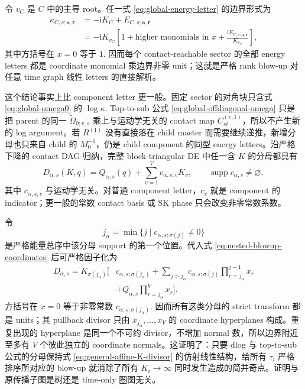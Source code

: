 \documentclass[11pt,a4paper]{ctexart}
\newcommand{\ii}{\mathrm i}
\begin{document}
令 $v_C$ 是 $C$ 中的主导 root。任一式 \eqref{eq:global-energy-letter} 的边界形式为
\begin{equation}
 \begin{split}
 \kappa_{C,s;\bm a,\bm r}
 &=-\ii K_C+E_{C,s;\bm a,\bm r}\\
 &=-\ii K_{v_C}
 \left[1+\text{higher monomials in }x
 +\frac{\ii E_{C,s;\bm a,\bm r}}{K_{v_C}}\right],
 \end{split}
 \label{eq:boundary-letter-unit}
\end{equation}
其中方括号在 $x=0$ 等于 $1$. 因而每个 contact-reachable sector 的全部 energy letters 都是 coordinate monomial 乘边界非零 unit；这就是严格 rank blow-up 对任意 time graph 线性 letters 的直接解析。

这个结论事实上比 component letter 更一般。固定 sector 的对角块只含式 \eqref{eq:global-omega0} 的 $\log\kappa$. Top-to-sub 公式 \eqref{eq:global-offdiagonal-omega} 只是把 parent 的同一 $\widetilde\Omega_{0;v,s}$ 乘上与运动学无关的 contact map $C_{st}^{(v,1)}$，所以不产生新的 log argument。若 $R^{(1)}$ 没有直接落在 child master 而需要继续递推，新增分母也只来自 child 的 $M_0^{-1}$，仍是 child component 的同型 energy letters。沿严格下降的 contact DAG 归纳，完整 block-triangular DE 中任一含 $K$ 的分母都具有
\begin{equation}
 D_{\alpha,s}(K,q)
 =Q_{\alpha,s}(q)
 +\sum_{v=1}^{V}c_{\alpha,s;v}K_v,
 \qquad
 \operatorname{supp}c_{\alpha,s}\neq\varnothing,
 \label{eq:general-affine-K-divisor}
\end{equation}
其中 $c_{\alpha,s;v}$ 与运动学无关。对普通 component letter，$c_v$ 就是 component 的 indicator；更一般的常数 contact basis 或 SK phase 只会改变非零常数系数。

令
\begin{equation}
 j_\alpha=\min\{j\mid c_{\alpha,s;\sigma(j)}\neq0\}
\end{equation}
是严格能量总序中该分母 support 的第一个位置。代入式 \eqref{eq:nested-blowup-coordinates} 后可严格因子化为
\begin{equation}
 \begin{split}
 D_{\alpha,s}
 =K_{\sigma(j_\alpha)}\Bigg[&c_{\alpha,s;\sigma(j_\alpha)}
 +\sum_{j>j_\alpha}c_{\alpha,s;\sigma(j)}
   \prod_{r=j_\alpha}^{j-1}x_r\\
 &+Q_{\alpha,s}\prod_{r=j_\alpha}^{V}x_r\Bigg].
 \end{split}
 \label{eq:affine-divisor-blowup-factorization}
\end{equation}
方括号在 $x=0$ 等于非零常数 $c_{\alpha,s;\sigma(j_\alpha)}$. 因而所有这类分母的 strict transform 都是 units；其 pullback divisor 只由 $x_{j_\alpha},\ldots,x_V$ 的 coordinate hyperplanes 构成。重复出现的 hyperplane 是同一个不可约 divisor，不增加 normal 数，所以边界附近至多有 $V$ 个彼此独立的 coordinate normals。这证明了：只要 dlog 与 top-to-sub 公式的分母保持式 \eqref{eq:general-affine-K-divisor} 的仿射线性结构，给所有 $\tau_i$ 严格排序所对应的 blow-up 就消除了所有 $K_i\to\infty$ 同时发生造成的简并奇点。证明与原传播子图是树还是 time-only 圈图无关。
\end{document}
